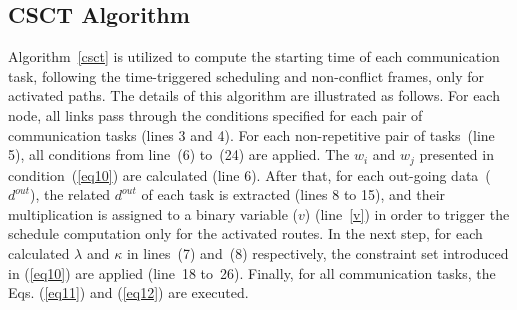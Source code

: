       \subsection{CSCT Algorithm} 
     Algorithm~\ref{csct} is utilized to compute 
    the starting time of each communication task, following the time-triggered scheduling and non-conflict frames, only for activated paths. The details of this algorithm are illustrated as follows. For each node, all links pass through the conditions specified for each pair of communication tasks (lines 3 and 4). For each non-repetitive pair of tasks~(line 5), all conditions from line~(6) to~(24) are applied. The $w_i$ and $w_j$ presented in condition~(\ref{eq10}) are calculated (line 6). After that, for each out-going data~($d^{out}$), the related $d^{out}$ of each task is extracted (lines 8 to 15), and their multiplication is assigned to a binary variable ($v$) (line~\ref{v}) in order to trigger the schedule computation only for the activated routes. In the next step, for each calculated $\lambda$ and $\kappa$ in lines~(7) and~(8) respectively, the constraint set introduced in (\ref{eq10}) are applied (line~18 to~26). Finally, for all communication tasks, the Eqs. (\ref{eq11}) and (\ref{eq12}) are executed. 
    
        
  
